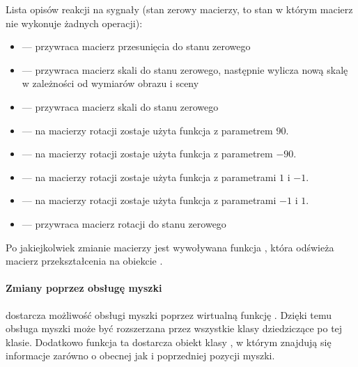 \par
Lista opisów reakcji na sygnały (stan zerowy macierzy, to stan w którym macierz nie wykonuje żadnych operacji):
\begin{itemize}

    \item {} --- przywraca macierz przesunięcia do stanu zerowego

    \item {} --- przywraca macierz skali do stanu zerowego, następnie wylicza nową skalę w zależności od wymiarów obrazu i sceny

    \item {} --- przywraca macierz skali do stanu zerowego

    \item {} --- na macierzy rotacji zostaje użyta funkcja  z parametrem $90$.

    \item {} --- na macierzy rotacji zostaje użyta funkcja  z parametrem $-90$.

    \item {} --- na macierzy rotacji zostaje użyta funkcja  z parametrami $1$ i $-1$.

    \item {} --- na macierzy rotacji zostaje użyta funkcja  z parametrami $-1$ i $1$.

    \item {} --- przywraca macierz rotacji do stanu zerowego

\end{itemize}
Po jakiejkolwiek zmianie macierzy jest wywoływana funkcja , która odświeża macierz przekształcenia na obiekcie .

\paragraph{Zmiany poprzez obsługę myszki}

\par
{} dostarcza możliwość obsługi myszki poprzez wirtualną funkcję .
Dzięki temu obsługa myszki może być rozszerzana przez wszystkie klasy dziedziczące po tej klasie.
Dodatkowo funkcja ta dostarcza obiekt klasy , w którym znajdują się informacje zarówno o obecnej jak i poprzedniej pozycji myszki.

